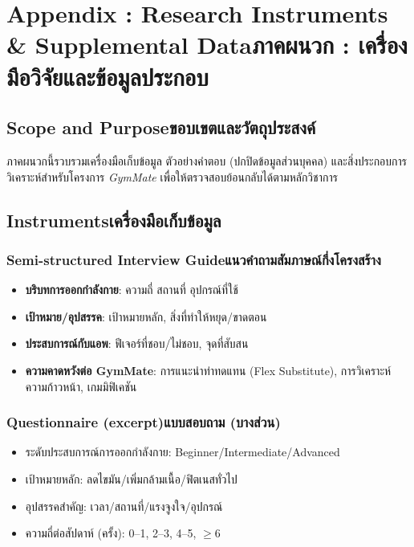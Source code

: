 \chapter{\ifenglish Appendix \thechapter: Research Instruments \& Supplemental Data\else ภาคผนวก \thechapter: เครื่องมือวิจัยและข้อมูลประกอบ\fi}
\label{app:first}

\section{\ifenglish Scope and Purpose\else ขอบเขตและวัตถุประสงค์\fi}
ภาคผนวกนี้รวบรวมเครื่องมือเก็บข้อมูล ตัวอย่างคำตอบ (ปกปิดข้อมูลส่วนบุคคล) และสิ่งประกอบการวิเคราะห์สำหรับโครงการ \textit{GymMate} เพื่อให้ตรวจสอบย้อนกลับได้ตามหลักวิชาการ

\section{\ifenglish Instruments\else เครื่องมือเก็บข้อมูล\fi}
\subsection{\ifenglish Semi-structured Interview Guide\else แนวคำถามสัมภาษณ์กึ่งโครงสร้าง\fi}
\begin{itemize}
  \item \textbf{บริบทการออกกำลังกาย}: ความถี่ สถานที่ อุปกรณ์ที่ใช้
  \item \textbf{เป้าหมาย/อุปสรรค}: เป้าหมายหลัก, สิ่งที่ทำให้หยุด/ขาดตอน
  \item \textbf{ประสบการณ์กับแอพ}: ฟีเจอร์ที่ชอบ/ไม่ชอบ, จุดที่สับสน
  \item \textbf{ความคาดหวังต่อ GymMate}: การแนะนำท่าทดแทน (Flex Substitute), การวิเคราะห์ความก้าวหน้า, เกมมิฟิเคชัน
\end{itemize}

\subsection{\ifenglish Questionnaire (excerpt)\else แบบสอบถาม (บางส่วน)\fi}
\begin{itemize}
  \item ระดับประสบการณ์การออกกำลังกาย: Beginner/Intermediate/Advanced
  \item เป้าหมายหลัก: ลดไขมัน/เพิ่มกล้ามเนื้อ/ฟิตเนสทั่วไป
  \item อุปสรรคสำคัญ: เวลา/สถานที่/แรงจูงใจ/อุปกรณ์
  \item ความถี่ต่อสัปดาห์ (ครั้ง): 0–1, 2–3, 4–5, $\ge$6
\end{itemize}

